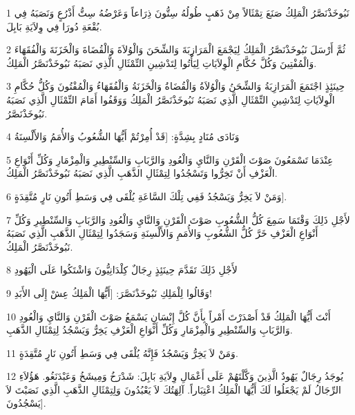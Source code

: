 \par 1 نَبُوخَذْنَصَّرُ الْمَلِكُ صَنَعَ تِمْثَالاً مِنْ ذَهَبٍ طُولُهُ سِتُّونَ ذِرَاعاً وَعَرْضُهُ سِتُّ أَذْرُعٍ وَنَصَبَهُ فِي بُقْعَةِ دُورَا فِي وِلاَيَةِ بَابِلَ.
\par 2 ثُمَّ أَرْسَلَ نَبُوخَذْنَصَّرُ الْمَلِكُ لِيَجْمَعَ الْمَرَازِبَةَ وَالشِّحَنَ وَالْوُلاَةَ وَالْقُضَاةَ وَالْخَزَنَةَ وَالْفُقَهَاءَ وَالْمُفْتِينَ وَكُلَّ حُكَّامِ الْوِلاَيَاتِ لِيَأْتُوا لِتَدْشِينِ التِّمْثَالِ الَّذِي نَصَبَهُ نَبُوخَذْنَصَّرُ الْمَلِكُ.
\par 3 حِينَئِذٍ اجْتَمَعَ الْمَرَازِبَةُ وَالشِّحَنُ وَالْوُلاَةُ وَالْقُضَاةُ وَالْخَزَنَةُ وَالْفُقَهَاءُ وَالْمُفْتُونَ وَكُلُّ حُكَّامِ الْوِلاَيَاتِ لِتَدْشِينِ التِّمْثَالِ الَّذِي نَصَبَهُ نَبُوخَذْنَصَّرُ الْمَلِكُ وَوَقَفُوا أَمَامَ التِّمْثَالِ الَّذِي نَصَبَهُ نَبُوخَذْنَصَّرُ.
\par 4 وَنَادَى مُنَادٍ بِشِدَّةٍ: [قَدْ أُمِرْتُمْ أَيُّهَا الشُّعُوبُ وَالأُمَمُ وَالأَلْسِنَةُ
\par 5 عِنْدَمَا تَسْمَعُونَ صَوْتَ الْقَرْنِ وَالنَّايِ وَالْعُودِ وَالرَّبَابِ وَالسِّنْطِيرِ وَالْمِزْمَارِ وَكُلِّ أَنْوَاعِ الْعَزْفِ أَنْ تَخِرُّوا وَتَسْجُدُوا لِتِمْثَالِ الذَّهَبِ الَّذِي نَصَبَهُ نَبُوخَذْنَصَّرُ الْمَلِكُ.
\par 6 وَمَنْ لاَ يَخِرُّ وَيَسْجُدُ فَفِي تِلْكَ السَّاعَةِ يُلْقَى فِي وَسَطِ أَتُونِ نَارٍ مُتَّقِدَةٍ].
\par 7 لأَجْلِ ذَلِكَ وَقْتَمَا سَمِعَ كُلُّ الشُّعُوبِ صَوْتَ الْقَرْنِ وَالنَّايِ وَالْعُودِ وَالرَّبَابِ وَالسِّنْطِيرِ وَكُلِّ أَنْوَاعِ الْعَزْفِ خَرَّ كُلُّ الشُّعُوبِ وَالأُمَمِ وَالأَلْسِنَةِ وَسَجَدُوا لِتِمْثَالِ الذَّهَبِ الَّذِي نَصَبَهُ نَبُوخَذْنَصَّرُ الْمَلِكُ.
\par 8 لأَجْلِ ذَلِكَ تَقَدَّمَ حِينَئِذٍ رِجَالٌ كِلْدَانِيُّونَ وَاشْتَكُوا عَلَى الْيَهُودِ
\par 9 وَقَالُوا لِلْمَلِكِ نَبُوخَذْنَصَّرَ: [أَيُّهَا الْمَلِكُ عِشْ إِلَى الأَبَدِ!
\par 10 أَنْتَ أَيُّهَا الْمَلِكُ قَدْ أَصْدَرْتَ أَمْراً بِأَنَّ كُلَّ إِنْسَانٍ يَسْمَعُ صَوْتَ الْقَرْنِ وَالنَّايِ وَالْعُودِ وَالرَّبَابِ وَالسِّنْطِيرِ وَالْمِزْمَارِ وَكُلِّ أَنْوَاعِ الْعَزْفِ يَخِرُّ وَيَسْجُدُ لِتِمْثَالِ الذَّهَبِ.
\par 11 وَمَنْ لاَ يَخِرُّ وَيَسْجُدُ فَإِنَّهُ يُلْقَى فِي وَسَطِ أَتُونِ نَارٍ مُتَّقِدَةٍ.
\par 12 يُوجَدُ رِجَالٌ يَهُودٌ الَّذِينَ وَكَّلْتَهُمْ عَلَى أَعْمَالِ وِلاَيَةِ بَابِلَ: شَدْرَخُ وَمِيشَخُ وَعَبْدَنَغُو. هَؤُلاَءِ الرِّجَالُ لَمْ يَجْعَلُوا لَكَ أَيُّهَا الْمَلِكُ اعْتِبَاراً. آلِهَتُكَ لاَ يَعْبُدُونَ وَلِتِمْثَالِ الذَّهَبِ الَّذِي نَصَبْتَ لاَ يَسْجُدُونَ].

